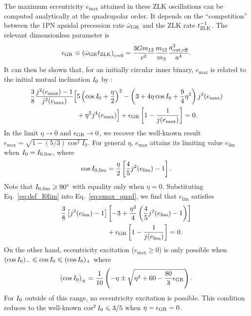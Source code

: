 \documentclass[
        fleqn,
        usenatbib,
    ]{mnras}
\newcommand*{\p}[1]{\left(#1\right)}
\newcommand*{\s}[1]{\left[#1\right]}
\begin{document}
The maximum eccentricity $e_{\max}$ attained in these ZLK oscillations can be
computed analytically at the quadrupolar order. It depends on the
``competition'' between the 1PN apsidal precession rate $\dot{\omega}_{\rm GR}$
and the ZLK rate $t_{\rm ZLK}^{-1}$. The relevant dimensionless parameter is
\begin{equation}
    \epsilon_{\rm GR} \equiv \p{\dot{\omega}_{\rm GR} t_{\rm ZLK}}_{e = 0}
        = \frac{3Gm_{12}}{c^2} \frac{m_{12}}{m_3}\frac{a_{\rm out, eff}^3}{a^4}.
\end{equation}
It can then be shown that, for an initially circular inner binary, $e_{\max}$ is
related to the initial mutual inclination $I_{\rm 0}$ by \citep{LML15,
anderson2016formation}:
\begin{align}
    \frac{3}{8}\frac{j^2(e_{\max}) - 1}{j^2(e_{\max})}\Big[&
        5\p{\cos I_0 + \frac{\eta}{2}}^2
        - \p{3 + 4\eta \cos I_0 + \frac{9}{4}\eta^2}j^2(e_{\max})
            \nonumber\\
        &+ \eta^2 j^4(e_{\max})
    \Big] + \epsilon_{\rm GR}\s{1 - \frac{1}{j(e_{\max})}} = 0.
    \label{eq:emax_quad}
\end{align}
In the limit $\eta \to 0$ and $\epsilon_{\rm GR} \to 0$, we recover the
well-known result $e_{\max} = \sqrt{1 - (5/3) \cos^2 I_0}$. For general $\eta$,
$e_{\max}$ attains its limiting value $e_{\lim}$ when $I_{\rm 0} = I_{\rm 0,
\lim}$, where
\begin{equation}
    \cos I_{\rm 0, \lim} = \frac{\eta}{2}\s{\frac{4}{5}j^2(e_{\lim}) -
        1}.\label{eq:def_I0lim}
\end{equation}
Note that $I_{\rm 0, \lim} \geq 90^\circ$ with equality only when $\eta
= 0$. Substituting Eq.~\eqref{eq:def_I0lim} into Eq.~\eqref{eq:emax_quad}, we find
that $e_{\lim}$ satisfies
\begin{align}
    \frac{3}{8}\s{j^2(e_{\lim}) - 1}&\s{-3 + \frac{\eta^2}{4}
        \p{\frac{4}{5}j^2(e_{\lim}) - 1}}\nonumber\\
        &+ \epsilon_{\rm GR}\s{1 - \frac{1}{j(e_{\lim})}} = 0.
        \label{eq:def_elim}
\end{align}
On the other hand, eccentricity excitation ($e_{\max} \geq 0$) is only possible
when $(\cos I_{\rm 0})_- \leq \cos I_{\rm 0} \leq (\cos I_{\rm 0})_+$ where
\begin{equation}
    \p{\cos I_{\rm 0}}_{\pm} = \frac{1}{10}\p{-\eta \pm \sqrt{\eta^2 + 60 -
        \frac{80}{3}\epsilon_{\rm GR}}}.\label{eq:I0bounds}
\end{equation}
For $I_{\rm 0}$ outside of this range, no eccentricity excitation is possible.
This condition reduces to the well-known $\cos^2 I_{\rm 0} \leq 3/5$ when $\eta
= \epsilon_{\rm GR} = 0$.
\end{document}
